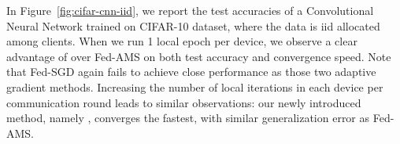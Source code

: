 \documentclass[11pt]{article}
\begin{document}
%



In Figure~\ref{fig:cifar-cnn-iid}, we report the test accuracies of a Convolutional Neural Network trained on CIFAR-10 dataset, where the data is iid allocated among clients. 
When we run 1 local epoch per device, we observe a clear advantage of \algo over Fed-AMS on both test accuracy and convergence speed.
Note that Fed-SGD again fails to achieve close performance as those two adaptive gradient methods. 
Increasing the number of local iterations in each device per communication round leads to similar observations: our newly introduced method, namely \algo, converges the fastest, with similar generalization error as Fed-AMS. 

%
%
\end{document}
